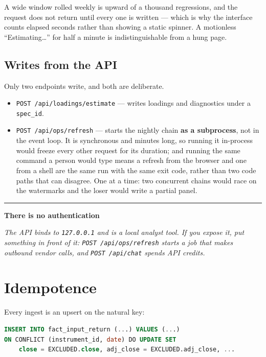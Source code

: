 \documentclass[11pt,a4paper]{article}
\newcommand{\code}[1]{\texttt{\small #1}}
\newenvironment{designnote}[1]
  {\par\vspace{1.6ex}%
   \begin{lrbox}{\notebox}\begin{minipage}{\textwidth}%
   {\color{rule}\rule{\textwidth}{0.4pt}}\par\vspace{0.7ex}
   {\small\sffamily\bfseries\color{navy}#1}\par\vspace{0.35ex}
   \small\itshape}
  {\par\vspace{0.7ex}\noindent{\color{rule}\rule{\textwidth}{0.4pt}}%
   \end{minipage}\end{lrbox}%
   \noindent\usebox{\notebox}\par\vspace{1.6ex}}
\begin{document}
A wide window rolled weekly is upward of a thousand regressions, and the request
does not return until every one is written --- which is why the interface counts
elapsed seconds rather than showing a static spinner. A motionless
``Estimating\dots'' for half a minute is indistinguishable from a hung page.

\subsection{Writes from the API}

Only two endpoints write, and both are deliberate.

\begin{itemize}[leftmargin=1.4em,itemsep=0.35ex]
\item \code{POST /api/loadings/estimate} --- writes loadings and diagnostics under
  a \code{spec\_id}.
\item \code{POST /api/ops/refresh} --- starts the nightly chain \textbf{as a
  subprocess}, not in the event loop. It is synchronous and minutes long, so
  running it in-process would freeze every other request for its duration; and
  running the same command a person would type means a refresh from the browser and
  one from a shell are the same run with the same exit code, rather than two code
  paths that can disagree. One at a time: two concurrent chains would race on the
  watermarks and the loser would write a partial panel.
\end{itemize}

\begin{designnote}{There is no authentication}
The API binds to \code{127.0.0.1} and is a local analyst tool. If you expose it,
put something in front of it: \code{POST /api/ops/refresh} starts a job that makes
outbound vendor calls, and \code{POST /api/chat} spends API credits.
\end{designnote}

\section{Idempotence}

Every ingest is an upsert on the natural key:

\begin{lstlisting}[language=SQL]
INSERT INTO fact_input_return (...) VALUES (...)
ON CONFLICT (instrument_id, date) DO UPDATE SET
    close = EXCLUDED.close, adj_close = EXCLUDED.adj_close, ...
\end{lstlisting}
\end{document}

